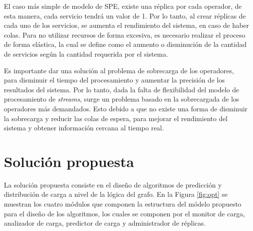 El caso más simple de modelo de SPE, existe una réplica por cada operador, de esta manera, cada servicio tendrá un valor de 1. Por lo tanto, al crear réplicas de cada uno de los servicios, se aumenta el rendimiento del sistema, en caso de haber colas. Para no utilizar recursos de forma excesiva, es necesario realizar el proceso de forma elástica, la cual se define como el aumento o disminución de la cantidad de servicios según la cantidad requerida por el sistema.


Es importante dar una solución al problema de sobrecarga de los operadores, para disminuir el tiempo del  procesamiento y aumentar la precisión de los resultados del sistema. Por lo tanto, dada la falta de flexibilidad del modelo de procesamiento de \textsl{streams}, surge un problema basado en la sobrecargada de los operadores más demandados. Esto debido a que no existe una forma de disminuir la sobrecarga y reducir las colas de espera, para mejorar el rendimiento del sistema y obtener información cercana al tiempo real.

\section{Solución propuesta}
\label{intro:solucion}

La solución propuesta consiste en el dise\~no de algoritmos de predicci\'on y distribuci\'on de carga a nivel de la l\'ogica del grafo. En la Figura \ref{fig:opt} se muestran los cuatro módulos que componen la estructura del m\'odelo propuesto para el dise\~no de los algoritmos, los cuales se componen por el monitor de carga, analizador de carga, predictor de carga y administrador de réplicas.

